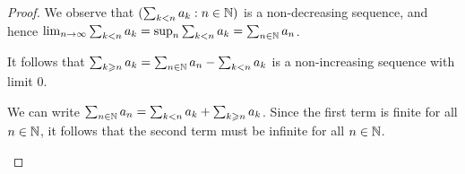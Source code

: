 \documentclass[letterpaper,10pt,english]{article}
\begin{document}
\begin{proof}
We observe that $(\sum_{k < n}a_k: n \in\mathbb{N})$ is a non-decreasing sequence, and hence $\lim_{n \to \infty}\sum_{k < n}a_k = \sup_n\sum_{k< n}a_k = \sum_{n \in \mathbb{N}}a_n$. 
\begin{compactenum}[(i)] 
\item It follows that $\sum_{k \geqslant n}a_k = \sum_{n \in \mathbb{N}}a_n - \sum_{k < n}a_k$ is a non-increasing sequence with limit $0$. 
\item We can write $\sum_{n \in \mathbb{N}}a_n = \sum_{k < n}a_k + \sum_{k \geqslant n}a_k$. 
Since the first term is finite for all $n \in \mathbb{N}$, it follows that the second term must be infinite for all $n \in \mathbb{N}$. 
\end{compactenum}
\end{proof}
\end{document}

